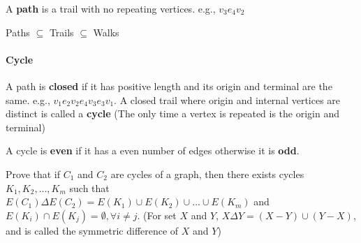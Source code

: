                     \begin{definition}[path]
                        A \textbf{path} is a trail with no repeating vertices. e.g., $v_3e_4v_2$
                    \end{definition}

                    Paths $\subseteq$ Trails $\subseteq$ Walks

                \paragraph{Cycle}
                    \begin{definition}
                        A path is \textbf{closed} if it has positive length and its origin and terminal are the same. e.g., $v_1e_2v_2e_4v_3e_3v_1$. A closed trail where origin and internal vertices are distinct is called a \textbf{cycle} (The only time a vertex is repeated is the origin and terminal)
                    \end{definition}

                    \begin{definition}
                        A cycle is \textbf{even} if it has a even number of edges otherwise it is \textbf{odd}.
                    \end{definition}

                    \begin{problem}
                        Prove that if $C_1$ and $C_2$ are cycles of a graph, then there exists cycles $K_1, K_2, ..., K_m$ such that $E(C_1)\Delta E(C_2) = E(K_1)\cup E(K_2) \cup...\cup E(K_m)$ and $E(K_i)\cap E(K_j)=\emptyset, \forall i \neq j$. (For set $X$ and $Y$, $X\Delta Y = (X-Y)\cup(Y-X)$, and is called the symmetric difference of $X$ and $Y$)
                    \end{problem}

